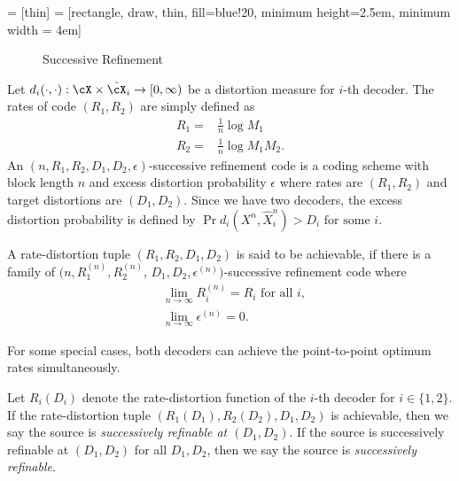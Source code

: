 \documentclass[draftclsnofoot, onecolumn, letterpaper, romanappendices]{IEEEtran}
\begin{document}
 = [thin]
 = [rectangle, draw, thin, fill=blue!20, minimum height=2.5em, minimum width = 4em]
\begin{figure}[h]
\centering
{}
\caption{Successive Refinement}\label{fig:Successive Refinement}
\end{figure} 
Let $d_i(\cdot,\cdot): \cX \times \hat{\cX}_i\rightarrow [0,\infty)$ be a distortion measure for $i$-th decoder.
The rates of code $(R_1,R_2)$ are simply defined as
\begin{align*}
R_1 =&\frac{1}{n}\log M_1\\
R_2 =&\frac{1}{n}\log M_1M_2.
\end{align*}
An $(n,R_1,R_2,D_1,D_2,\epsilon)$-successive refinement code is a coding scheme with block length $n$
and excess distortion probability $\epsilon$ where rates are $(R_1,R_2)$ and target distortions are $(D_1,D_2)$.
Since we have two decoders, the excess distortion probability is defined by $\Pr{d_i(X^n,\hat{X}_i^n)>D_i \mbox{ for some $i$}}$.
\begin{definition}
    A rate-distortion tuple $(R_1,R_2,D_1,D_2)$ is said to be achievable,
    if there is a family of $(n, R_1^{(n)}, R_2^{(n)}$, $D_1, D_2, \epsilon^{(n)})$-successive refinement code where
    \begin{align*}
        &\lim_{n\rightarrow\infty}R_i^{(n)}=R_i  \mbox{ for all $i$, }\\
        &\lim_{n\rightarrow\infty}\epsilon^{(n)}=0.
    \end{align*}
\end{definition}

For some special cases, both decoders can achieve the point-to-point optimum rates simultaneously.
\begin{definition}\label{def:successive refinability}
    Let $R_i(D_i)$ denote the rate-distortion function of the $i$-th decoder for $i\in\{1,2\}$.
    If the rate-distortion tuple $(R_1(D_1), R_2(D_2), D_1, D_2)$ is achievable,
    then we say the source is \emph{successively refinable at $(D_1,D_2)$}.
    If the source is successively refinable at $(D_1, D_2)$ for all $D_1,D_2$,
    then we say the source is \emph{successively refinable}.
\end{definition}
\end{document}
